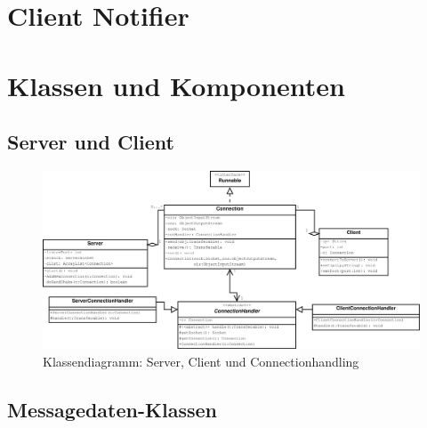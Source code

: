 \section {Client Notifier}


\section{Klassen und Komponenten}

\subsection{Server und Client}
\liable{\eddy}
\begin{figure}[H]
	\centering
	\label{dia:design:frontend:classes:svcl}
	\includegraphics[width=\textwidth]{design/frontend/classes/Server-Client-Klassen.pdf}
	\caption{Klassendiagramm: Server, Client und Connectionhandling}
\end{figure}

\subsection{Messagedaten-Klassen}
\liable{\eddy}


